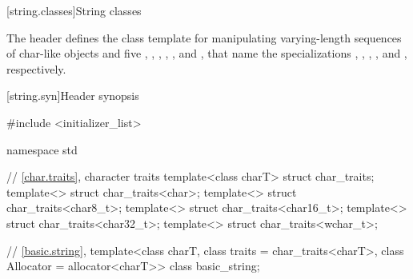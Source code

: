 [string.classes]{String classes}

\pnum
The header  defines the
 class template for manipulating
varying-length sequences of char-like objects and five
, ,
,
,
,
and , that name
the specializations
,
,
,
,
and
, respectively.

[string.syn]{Header  synopsis}
%

\begin{codeblock}
#include <initializer_list>

namespace std {
  // \ref{char.traits}, character traits
  template<class charT> struct char_traits;
  template<> struct char_traits<char>;
  template<> struct char_traits<char8_t>;
  template<> struct char_traits<char16_t>;
  template<> struct char_traits<char32_t>;
  template<> struct char_traits<wchar_t>;

  // \ref{basic.string}, 
  template<class charT, class traits = char_traits<charT>, class Allocator = allocator<charT>>
    class basic_string;

}
\end{codeblock}
